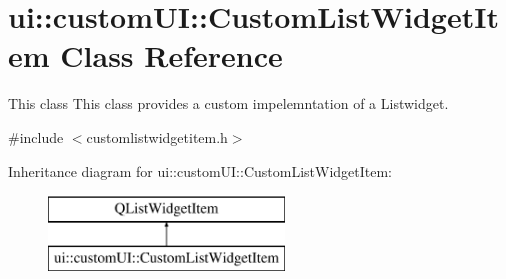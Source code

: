 \hypertarget{classui_1_1custom_u_i_1_1_custom_list_widget_item}{}\section{ui\+:\+:custom\+UI\+:\+:Custom\+List\+Widget\+Item Class Reference}
\label{classui_1_1custom_u_i_1_1_custom_list_widget_item}


This class This class provides a custom impelemntation of a Listwidget.  




{\ttfamily \#include $<$customlistwidgetitem.\+h$>$}

Inheritance diagram for ui\+:\+:custom\+UI\+:\+:Custom\+List\+Widget\+Item\+:\begin{figure}[H]
\begin{center}
\leavevmode
\includegraphics[height=2.000000cm]{classui_1_1custom_u_i_1_1_custom_list_widget_item}
\end{center}
\end{figure}
